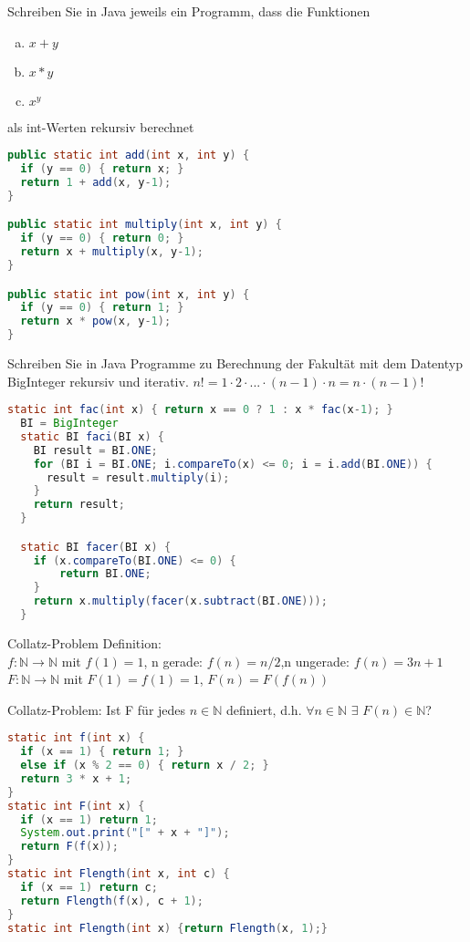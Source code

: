 \begin{card}
	Schreiben Sie in Java jeweils ein Programm, dass die Funktionen
	\begin{enumerate}[a)]
	\item $x+y$
	\item $x*y$
	\item $x^y$
	\end{enumerate}
	als int-Werten rekursiv berechnet
	\hr
	\begin{lstlisting}[language=Java]
public static int add(int x, int y) {
  if (y == 0) { return x; }
  return 1 + add(x, y-1);
}

public static int multiply(int x, int y) {
  if (y == 0) { return 0; }
  return x + multiply(x, y-1);
}

public static int pow(int x, int y) {
  if (y == 0) { return 1; }
  return x * pow(x, y-1);
}
	\end{lstlisting}
\end{card}

\begin{card}
	Schreiben Sie in Java Programme zu Berechnung der Fakultät mit dem Datentyp BigInteger rekursiv und iterativ.
	\hr
	$n! = 1 \cdot 2 \cdot ... \cdot (n-1) \cdot n = n  \cdot  (n-1)!$
	\begin{lstlisting}[language=Java]
	static int fac(int x) { return x == 0 ? 1 : x * fac(x-1); }
  BI = BigInteger
  static BI faci(BI x) {
    BI result = BI.ONE;
    for (BI i = BI.ONE; i.compareTo(x) <= 0; i = i.add(BI.ONE)) {
      result = result.multiply(i);
    }
    return result;
  }

  static BI facer(BI x) {
    if (x.compareTo(BI.ONE) <= 0) {
        return BI.ONE;
    }
    return x.multiply(facer(x.subtract(BI.ONE)));
  }
	\end{lstlisting}
\end{card}

\begin{card}
	Collatz-Problem Definition:\\
	$f: \mathbb{N} \rightarrow \mathbb{N}$ mit
	$f(1) = 1$, n gerade: $f(n) = n / 2$,n ungerade: $f(n) = 3n + 1$\\
	$F: \mathbb{N} \rightarrow \mathbb{N}$ mit $F(1) = f(1)  = 1$, $F(n) = F(f(n))$

	Collatz-Problem: Ist F für jedes $n \in \mathbb{N}$  definiert, d.h. $\forall n \in \mathbb{N}$ $\exists$ $F(n) \in \mathbb{N}$?
	\hr
	\begin{lstlisting}[language=Java]
static int f(int x) {
  if (x == 1) { return 1; }
  else if (x % 2 == 0) { return x / 2; }
  return 3 * x + 1;
}
static int F(int x) {
  if (x == 1) return 1;
  System.out.print("[" + x + "]");
  return F(f(x));
}
static int Flength(int x, int c) {
  if (x == 1) return c;
  return Flength(f(x), c + 1);
}
static int Flength(int x) {return Flength(x, 1);}
	\end{lstlisting}
\end{card}

